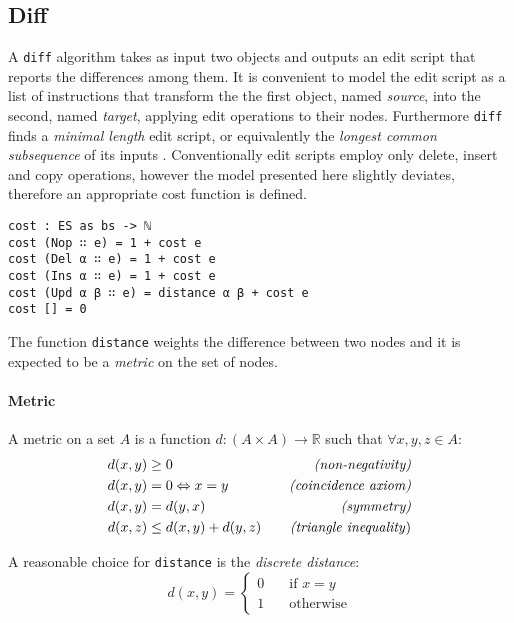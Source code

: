 \documentclass[../Thesis.tex]{subfiles}
\begin{document}
	\subsection{Diff}
	\label{subsec:AlgoDiff}
	A \texttt{diff} algorithm takes as input two objects 
	and outputs an edit script that reports the differences among them.
	It is convenient to model the edit script as a list of instructions that
	transform the the first object, named \emph{source}, into the second,
	named \emph{target}, applying edit operations to their nodes.
	Furthermore \texttt{diff} finds a \emph{minimal length} edit script, or
	equivalently the \emph{longest common subsequence} of its inputs
	\cite{Berg00, PierceDiff3}.
	Conventionally edit scripts employ only delete, insert and copy operations,
	however the model presented here slightly deviates, therefore an 
	appropriate cost function is defined.
	
	
\begin{verbatim}
cost : ES as bs -> ℕ
cost (Nop ∷ e) = 1 + cost e
cost (Del α ∷ e) = 1 + cost e
cost (Ins α ∷ e) = 1 + cost e
cost (Upd α β ∷ e) = distance α β + cost e 
cost [] = 0
\end{verbatim}

	The function \texttt{distance} weights the difference between two nodes 
	and it is expected to be a \emph{metric} on the set of nodes.

	\paragraph{Metric}	
	A metric on a set $A$ is a function $d	 : (A \times A) \rightarrow \mathbb{R}$
	such that $\forall x, y, z \in A$:
	\begin{align*}
		d(x, y) &\geq 0 \quad &\mbox{\emph{{(non-negativity)}}}\\ 
		d(x, y) &= 0 \Leftrightarrow x = y \quad &\mbox{\emph{(coincidence axiom)}} \\		
		d(x, y) &= d(y, x) \quad &\mbox{\emph{(symmetry)}}\\
		d(x, z) &\leq d(x, y) + d(y, z) \quad &\mbox{\emph{(triangle inequality})}
	\end{align*}
	
	A reasonable choice for \texttt{distance} is the \emph{discrete distance}:
	\[ d(x, y) = 
		\begin{cases} 
			0 \quad &\mbox{if } x = y \\
			1 \quad &\mbox {otherwise}		
		\end{cases} \]
	
\end{document}
